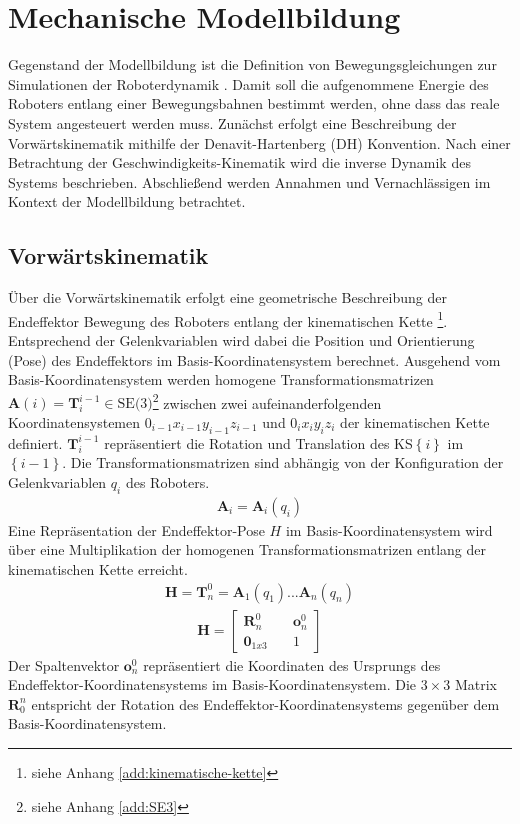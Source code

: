 \chapter{Mechanische Modellbildung}
\label{cha:Modellbildung}
%
Gegenstand der Modellbildung ist die Definition von Bewegungsgleichungen zur Simulationen der Roboterdynamik \cite[S.~247]{Grimble.2009}. Damit soll die aufgenommene Energie des Roboters entlang einer Bewegungsbahnen bestimmt werden, ohne dass das reale System angesteuert werden muss. Zunächst erfolgt eine Beschreibung der Vorwärtskinematik mithilfe der Denavit-Hartenberg (DH) Konvention. Nach einer Betrachtung der Geschwindigkeits-Kinematik wird die inverse Dynamik des Systems beschrieben.  Abschließend werden Annahmen und Vernachlässigen im Kontext der Modellbildung betrachtet.

\section{Vorwärtskinematik}
Über die Vorwärtskinematik erfolgt eine geometrische Beschreibung der Endeffektor Bewegung des Roboters entlang der kinematischen Kette \footnote{siehe Anhang \ref{add:kinematische-kette}}. Entsprechend der Gelenkvariablen wird dabei die Position und Orientierung (Pose) des Endeffektors im Basis-Koordinatensystem berechnet. Ausgehend vom Basis-Koordinatensystem werden homogene Transformationsmatrizen $\bm{A}(i) = \bm{T}^{i-1}_i \in \text{SE(3)}$\footnote{siehe Anhang \ref{add:SE3}} zwischen zwei aufeinanderfolgenden Koordinatensystemen $0_{i-1}x_{i-1}y_{i-1}z_{i-1}$ und $0_ix_iy_iz_i$ der kinematischen Kette definiert. $\bm{T}^{i-1}_i$ repräsentiert die  Rotation und Translation des KS$\left\{i\right\}$ im $\left\{i-1\right\}$. Die Transformationsmatrizen sind abhängig von der Konfiguration der Gelenkvariablen $q_i$ des Roboters. 
\begin{align}
	\bm{A}_i = \bm{A}_i(q_i)
\end{align}
Eine Repräsentation der Endeffektor-Pose $H$ im Basis-Koordinatensystem wird über eine Multiplikation der homogenen Transformationsmatrizen entlang der kinematischen Kette erreicht. 
\begin{align}
	\label{eqn:homogeneTransformation}
	\bm{H} = \bm{T}^0_n = \bm{A}_1(q_1) ... \bm{A}_n(q_n)
\end{align}
\begin{align}
	\bm{H} =\begin{bmatrix} \bm{R}^0_n &\quad \bm{o}^0_n\\ \mathbf{0}_{1x3} &\quad 1\end{bmatrix}
\end{align}
Der Spaltenvektor $\bm{o}^0_n$ repräsentiert die Koordinaten des Ursprungs des Endeffektor-Koordinatensystems im Basis-Koordinatensystem. Die $3 \times 3 $ Matrix $\bm{R}^n_0$ entspricht der Rotation des Endeffektor-Koordinatensystems gegenüber dem Basis-Koordinatensystem. \cite[S.~75~ff.]{Spong.2020} 
